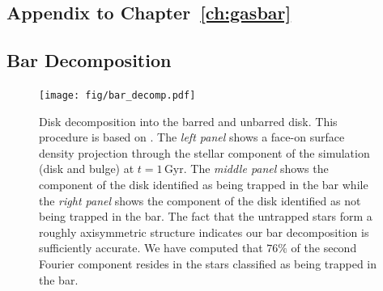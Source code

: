 
\begin{appendices}

\chapter{Appendix to Chapter~\ref{ch:gasbar}}\label{ch:app_gasbar}
\section{Bar Decomposition}
\label{ch2:app:bardecomp}
\begin{figure}
    \centering
    \texttt{[image: fig/bar\_decomp.pdf]}
    \caption{Disk decomposition into the barred and unbarred disk. This
    procedure is based on \citet{2016MNRAS.463.1952P}. The \textit{left panel}
    shows a face-on surface density projection through the stellar component of
    the \SMUGGLE{} simulation (disk and bulge) at $t=1\,\textrm{Gyr}$. The
    \textit{middle panel} shows the component of the disk identified as being
    trapped in the bar while the \textit{right panel} shows the component of the
    disk identified as not being trapped in the bar. The fact that the untrapped
    stars form a roughly axisymmetric structure indicates our bar decomposition
    is sufficiently accurate. We have computed that $76\%$ of the second Fourier
    component resides in the stars classified as being trapped in the bar.}
    \label{fig:decomp}
\end{figure}


\end{appendices}

